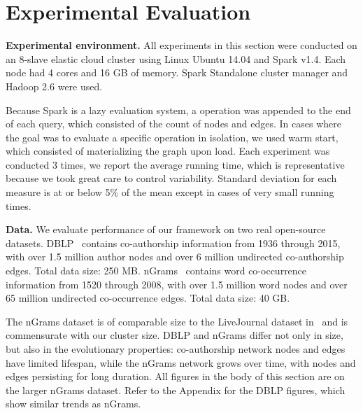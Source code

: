 \section{Experimental Evaluation}
\label{sec:exp}

{\bf Experimental environment.} All experiments in this section were
conducted on an 8-slave elastic cloud cluster using Linux Ubuntu 14.04
and Spark v1.4.  Each node had 4 cores and 16 GB of memory.  Spark
Standalone cluster manager and Hadoop 2.6 were used.

Because Spark is a lazy evaluation system, a 
operation was appended to the end of each query, which consisted of
the count of nodes and edges.  In cases where the goal was to evaluate
a specific operation in isolation, we used warm start, which consisted
of materializing the graph upon load.  Each experiment was conducted 3
times, we report the average running time, which is representative
because we took great care to control variability.  Standard deviation
for each measure is at or below 5\% of the mean except in cases of
very small running times.

{\bf Data.}  We evaluate performance of our framework on two real
open-source datasets.
DBLP~\cite{dblp} contains co-authorship information from 1936 through
2015, with over 1.5 million author nodes and over 6 million undirected
co-authorship edges.  Total data size: 250 MB.
%
nGrams~\cite{nGrams} contains word co-occurrence information from 1520
through 2008, with over 1.5 million word nodes and over 65 million
undirected co-occurrence edges.  Total data size: 40 GB.  


The nGrams dataset is of comparable size to the LiveJournal dataset
in~\cite{Xin2013} and is commensurate with our cluster size.  DBLP and
nGrams differ not only in size, but also in the evolutionary
properties: co-authorship network nodes and edges have limited
lifespan, while the nGrams network grows over time, with nodes and
edges persisting for long duration.  All figures in the body of this
section are on the larger nGrams dataset.  Refer to the Appendix for
the DBLP figures, which show similar trends as nGrams.

